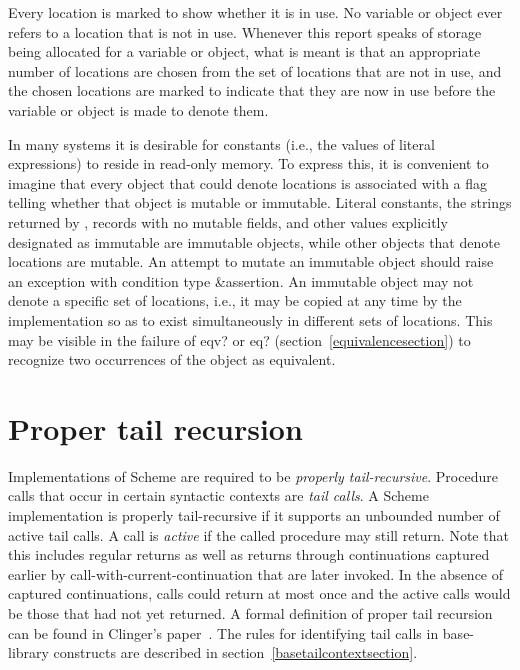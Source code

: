 Every location is marked to show whether it is in use.
No variable or object ever refers to a location that is not in use.
Whenever this report speaks of storage being allocated for a variable
or object, what is meant is that an appropriate number of locations are
chosen from the set of locations that are not in use, and the chosen
locations are marked to indicate that they are now in use before the variable
or object is made to denote them.

In many systems it is desirable for constants (i.e., the values of
literal expressions) to reside in read-only memory.  To express this,
it is convenient to imagine that every object that could denote locations
is associated with a flag telling whether that object is
mutable or immutable.  Literal
constants, the strings returned by , records with
no mutable fields, and other values explicitly designated as immutable
are immutable objects, while other objects that denote locations
are mutable.  
An attempt to mutate an immutable object
should raise an exception with condition type {\cf\&assertion}.
An immutable object may not denote a specific set of locations, i.e.,
it may be copied at any time by the implementation so as to exist
simultaneously in different sets of locations.
This may be visible in the failure of {\cf eqv?} or {\cf eq?}
(section~\ref{equivalencesection}) to
recognize two occurrences of the object as equivalent.

\section{Proper tail recursion}
\label{proper tail recursion}

Implementations of Scheme are required to be
{\em properly tail-recursive}.
Procedure calls that occur in certain syntactic
contexts are \textit{tail calls}.  A Scheme implementation is
properly tail-recursive if it supports an unbounded number of active
tail calls.  A call is {\em active} if the called procedure may still
return.  Note that this includes regular returns as well as returns
through continuations captured earlier by
{\cf call-with-current-continuation} that are later invoked.
In the absence of captured continuations, calls could
return at most once and the active calls would be those that had not
yet returned.
A formal definition of proper tail recursion can be found
in Clinger's paper~\cite{propertailrecursion}.  The rules for identifying tail calls
in base-library constructs are described in
section~\ref{basetailcontextsection}.

